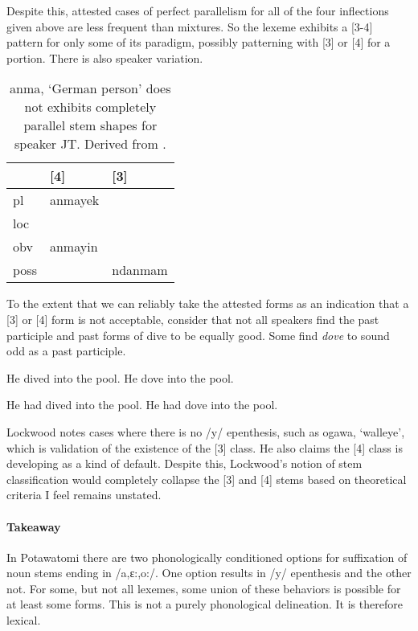 Despite this, attested cases of perfect parallelism for all of the
four inflections given above are less frequent than mixtures. So the
lexeme exhibits a [3-4] pattern for only some of its paradigm,
possibly patterning with [3] or [4] for a portion. There is also
speaker variation.

\begin{table}[H]
  \centering
  \begin{tabular}{l|ll}
             & [4] & [3] \\\hline
    {\sc pl} & anmayek & \\
    {\sc loc} & & \\
    {\sc obv} & anmayin & \\
    {\sc poss} & & ndanmam \\
  \end{tabular}
  \caption{{\sc anma}, `German person' does not exhibits completely
    parallel stem shapes for speaker JT. Derived from \citet[p.\
    87]{lockwood2017potawatomi}.}
  \label{bee}
\end{table}

To the extent that we can reliably take the attested forms as an
indication that a [3] or [4] form is not acceptable, consider that not
all speakers find the past participle and past forms of {\sc dive} to
be equally good. Some find {\it dove} to sound odd as a past
participle.

\pex
\a He dived into the pool.
\a He dove into the pool.
\xe

\pex
\a He had dived into the pool.
\a He had dove into the pool.
\xe

Lockwood notes cases where there is no /y/ epenthesis, such as {\sc
  ogawa}, `walleye', which is validation of the existence of the [3]
class. He also claims the [4] class is developing as a kind of
default. Despite this, Lockwood's notion of stem classification would
completely collapse the [3] and [4] stems based on theoretical
criteria I feel remains unstated.

\paragraph{Takeaway} In Potawatomi there are two phonologically
conditioned options for suffixation of noun stems ending in
/a,ɛ:,o:/. One option results in /y/ epenthesis and the other not. For
some, but not all lexemes, some union of these behaviors is possible
for at least some forms. This is not a purely phonological
delineation. It is therefore lexical.

